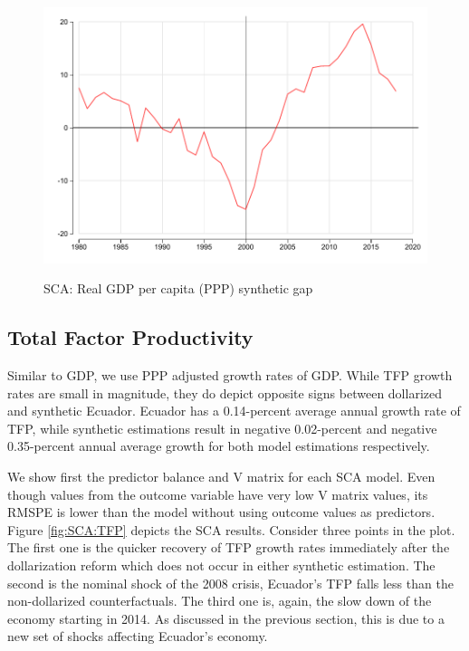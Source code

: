 \documentclass[12pt]{article}
\begin{document}
\begin{figure}[!htbp]
    \caption{SCA: Real GDP per capita (PPP) synthetic gap}
    \centering
    \includegraphics{STATA/Fig_GDP_GAP.pdf}
    \label{fig:SCA_gap}
\end{figure}

\subsection{Total Factor Productivity}

Similar to GDP, we use PPP adjusted growth rates of GDP. While TFP growth rates are small in magnitude, they do depict opposite signs between dollarized and synthetic Ecuador. Ecuador has a 0.14-percent average annual growth rate of TFP, while synthetic estimations result in  negative 0.02-percent and negative 0.35-percent annual average growth for both model estimations respectively. 

We show first the predictor balance and V matrix for each SCA model. Even though values from the outcome variable have very low V matrix values, its RMSPE is lower than the model without using outcome values as predictors. Figure \ref{fig:SCA:TFP} depicts the SCA results. Consider three points in the plot. The first one is the quicker recovery of TFP growth rates immediately after the dollarization reform which does not occur in either synthetic estimation. The second is the nominal shock of the 2008 crisis, Ecuador's TFP falls less than the non-dollarized counterfactuals. The third one is, again, the slow down of the economy starting in 2014. As discussed in the previous section, this is due to a new set of shocks affecting Ecuador's economy.
\end{document}
